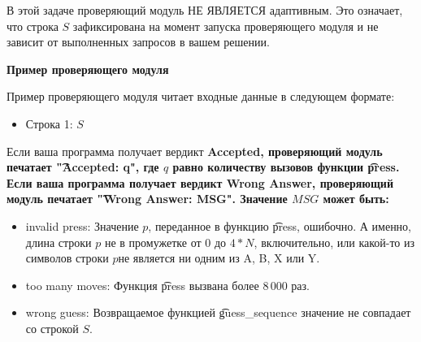 В этой задаче проверяющий модуль НЕ ЯВЛЯЕТСЯ адаптивным. Это означает, что строка $S$ зафиксирована на момент запуска проверяющего модуля и не зависит от выполненных запросов в вашем решении. 

\bf{Пример проверяющего модуля}

 Пример проверяющего модуля читает входные данные в следующем формате: 

\begin{itemize}
\item Строка 1: $S$
\end{itemize}

Если ваша программа получает вердикт \bf{Accepted}, проверяющий модуль печатает \t{"Accepted: q"}, где $q$ равно количеству вызовов функции \t{press}. 
Если ваша программа получает вердикт \bf{Wrong Answer}, проверяющий модуль печатает \t{"Wrong Answer: MSG"}. Значение $MSG$ может быть: 

\begin{itemize}
\item invalid press: Значение $p$, переданное в функцию \t{press}, ошибочно. А именно, длина строки $p$ не в промужетке от $0$ до $4*N$, включительно, или какой-то из символов строки $p$не является ни одним из A, B, X или Y. 
\item too many moves: Функция \t{press} вызвана более $8\,000$ раз. 
\item wrong guess: Возвращаемое функцией \t{guess_sequence} значение не совпадает со строкой $S$. 
\end{itemize}